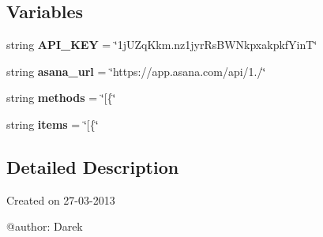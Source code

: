 \subsection*{\-Variables}
\begin{DoxyCompactItemize}
\item 
\hypertarget{namespace_asana_a865e16d7fdb0a5986f58364e45cb7fd5}{string {\bfseries \-A\-P\-I\-\_\-\-K\-E\-Y} = \char`\"{}1j\-U\-Zq\-Kkm.\-nz1jyr\-Rs\-B\-W\-Nkpxakpkf\-Yin\-T\char`\"{}}\label{namespace_asana_a865e16d7fdb0a5986f58364e45cb7fd5}

\item 
\hypertarget{namespace_asana_aba8b7c0068b5403a07a76a92842a8450}{string {\bfseries asana\-\_\-url} = \char`\"{}https\-://app.\-asana.\-com/api/1./\char`\"{}}\label{namespace_asana_aba8b7c0068b5403a07a76a92842a8450}

\item 
\hypertarget{namespace_asana_ad6985323125eb1c3f05d52823049c5b9}{string {\bfseries methods} = \char`\"{}\mbox{[}\{\char`\"{}}\label{namespace_asana_ad6985323125eb1c3f05d52823049c5b9}

\item 
\hypertarget{namespace_asana_aab4c7ec0c41a7613af224ac7c6ce9bab}{string {\bfseries items} = \char`\"{}\mbox{[}\{\char`\"{}}\label{namespace_asana_aab4c7ec0c41a7613af224ac7c6ce9bab}

\end{DoxyCompactItemize}


\subsection{\-Detailed \-Description}
\begin{DoxyVerb}
Created on 27-03-2013

@author: Darek
\end{DoxyVerb}
 